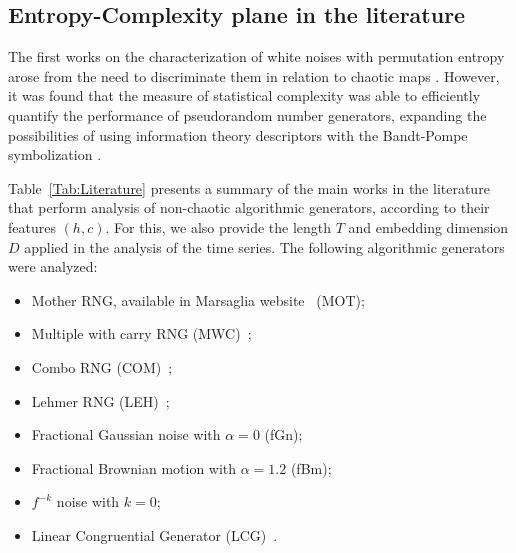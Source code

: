 \subsection{Entropy-Complexity plane in the literature}

The first works on the characterization of white noises with permutation entropy arose from the need to discriminate them in relation to chaotic maps \citep{rosso2013characterization,olivares2012contrasting, xiong2020complexity}.
However, it was found that the measure of statistical complexity was able to efficiently quantify the performance of pseudorandom number generators, expanding the possibilities of using information theory descriptors with the Bandt-Pompe symbolization \citep{larrondo2002statistical, gonzalez2005statistical}.

Table~\ref{Tab:Literature} presents a summary of the main works in the literature that perform analysis of non-chaotic algorithmic generators, according to their features $(h, c)$.
For this, we also provide the length $T$ and embedding dimension $D$ applied in the analysis of the time series.
The following algorithmic generators were analyzed:
\begin{itemize}
    \item Mother RNG, available in Marsaglia website~\cite{marsaglia1994yet} (MOT);
    \item Multiple with carry RNG (MWC)~\cite{marsaglia1994yet};
    \item Combo RNG (COM)~\cite{marsaglia1994yet};
    \item Lehmer RNG (LEH)~\cite{payne1969coding};
    \item Fractional Gaussian noise with $\alpha = 0$ (fGn);
    \item Fractional Brownian motion with $\alpha = 1.2$ (fBm);
    \item $f^{-k}$ noise with $k = 0$;
    \item Linear Congruential Generator (LCG)~\cite{knuth1997sorting}.
\end{itemize}

